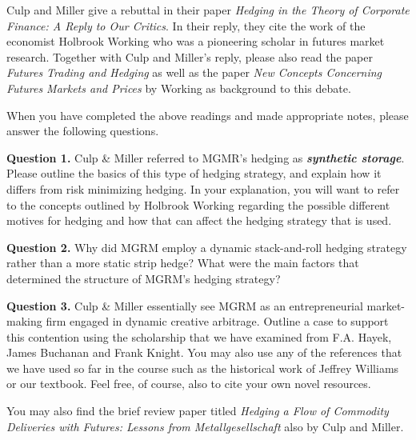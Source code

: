 \documentclass[12pt]{article}
\begin{document}
\vspace{10mm}

Culp and Miller give a rebuttal in their paper \textit{Hedging in the Theory of Corporate Finance: A Reply to Our Critics}. In their reply, they
cite the work of the economist Holbrook Working who was a pioneering scholar in futures market research. Together with Culp and Miller's reply, 
please also read the paper \textit{Futures Trading and Hedging} as well as the paper \textit{New Concepts Concerning Futures Markets and Prices}
by Working as background to this debate. 

\vspace{10mm}

When you have completed the above readings and made appropriate notes, please answer the following questions.

\vspace{10mm}

\textbf{Question 1.} Culp \& Miller referred to MGMR's hedging as \textbf{\textit{synthetic storage}}. Please outline the basics of this
		type of hedging strategy, and explain how it differs from risk minimizing hedging. In your explanation, you will want to refer to the concepts
		outlined by Holbrook Working regarding the possible different motives for hedging and how that can affect the hedging strategy that is used. 

\vspace{10mm}

\textbf{Question 2.} Why did MGRM employ a dynamic stack-and-roll hedging strategy rather than a more static strip hedge? What were the main factors
       that determined the structure of MGRM's hedging strategy? 

\vspace{10mm}

\textbf{Question 3.} Culp \& Miller essentially see MGRM as an entrepreneurial market-making firm engaged in dynamic creative arbitrage. Outline a case
       to support this contention using the scholarship that we have examined from F.A. Hayek, James Buchanan and Frank Knight. You may also use any of
	   the references that we have used so far in the course such as the historical work of Jeffrey Williams or our textbook. Feel free, of course, also
	   to cite your own novel resources. 


\vspace{10mm}

You may also find the brief review paper titled \textit{Hedging a Flow of Commodity Deliveries with Futures: Lessons from Metallgesellschaft} also by
Culp and Miller.
\end{document}
